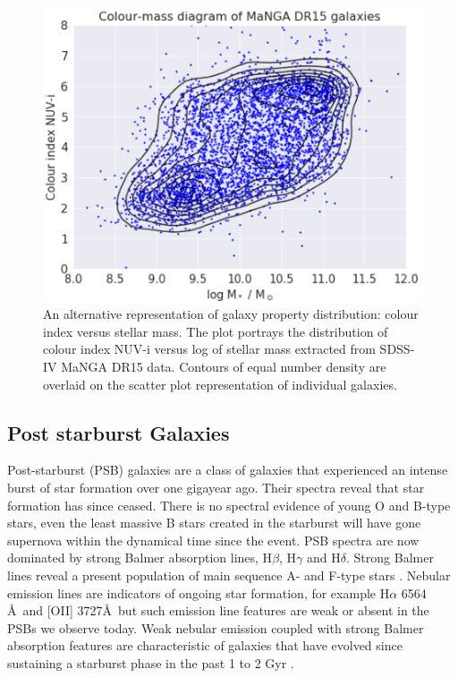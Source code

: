 \begin{figure}
    \centering
    \includegraphics[width=\columnwidth]{images/CMDs/CMD-DR15-ALL-15.png}
    \caption[Colour-mass diagram of the complete MaNGA DR15 galaxy population]{An alternative representation of galaxy property distribution: colour index versus stellar mass. The plot portrays the distribution of colour index NUV-i versus log of stellar mass extracted from SDSS-IV MaNGA DR15 data. Contours of equal number density are overlaid on the scatter plot representation of individual galaxies.}
    \label{fig:CMD-mass-1}
\end{figure}

\subsection{Post starburst Galaxies}
\label{post-starburst-galaxies}
Post-starburst (PSB) galaxies are a class of galaxies that experienced an intense burst of star formation over one gigayear ago. Their spectra reveal that star formation has since ceased. There is no spectral evidence of young O and B-type stars, even the least massive B stars created in the starburst will have gone supernova within the dynamical time since the  event. PSB spectra are now dominated by strong Balmer absorption lines, H$\beta$, H$\gamma$ and H$\delta$. Strong Balmer lines reveal a present population of main sequence A- and F-type stars \citep{1997A&A...325.1025P}. Nebular emission lines are indicators of ongoing star formation, for example H$\alpha$ 6564 \AA\ and [OII] 3727\AA\, but such emission line features are weak or absent in the PSBs we observe today. Weak nebular emission coupled with strong Balmer absorption features are characteristic of galaxies that have evolved since sustaining a starburst phase in the past 1 to 2 Gyr \citep{2001ApJ...547L..17B,2003PASJ...55..771G,2004MNRAS.355..713B,2005MNRAS.357..937G,2018MNRAS.477.1708P}. 

